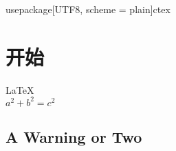 
usepackage[UTF8, scheme = plain]{ctex}
\usepackage[version=4]{mhchem}

               
 
 
\section{开始}          
\LaTeX \,\\ 
 $a^2+b^2=c^2$

\subsection{A Warning or Two}  


                 
